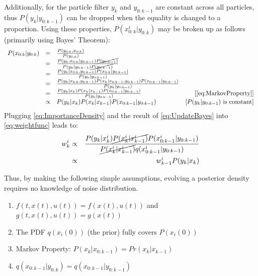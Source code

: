 Additionally, for the particle filter $y_k$ and $y_{0:k-1}$ are 
constant across all particles, thus $P(y_k| y_{0:k-1})$ can
be dropped when the equality is changed to a proportion. 
Using these properties, $P(x^i_{0:k} | y_{0:k})$ may be broken up as follows 
(primarily using Bayes' Theorem):
\begin{equation}
\begin{array}{lclr}
P(x_{0:k} | y_{0:k}) & = & \frac{P(y_{0:k}, x_{0:k})}{P(y_{0:k})} & \\
 & = & \frac{P(y_k, x_{0:k} | y_{0:k-1}) \cancel{P(y_{0:k-1})}}{P(y_k | y_{0:k-1}) \cancel{P(y_{0:k-1})}} & \\
 & = & \frac{P(y_k| x_{0:k}, y_{0:k-1}) P(x_{0:k} | y_{0:k-1})}{P(y_k | y_{0:k-1}) } & \\
 & = & \frac{P(y_k| x_{0:k}, y_{0:k-1}) P(x_k | x_{0:k-1}, y_{0:k-1}) P(x_{0:k-1} | y_{0:k-1})}{P(y_k | y_{0:k-1})} &  \\
& = & \frac{P(y_k| x_k) P(x_k | x_{k-1}) P(x_{0:k-1} | y_{0:k-1})}{P(y_k | y_{0:k-1})}  & [\text{\autoref{eq:MarkovProperty}}]\\
& \propto & P(y_k| x_k) P(x_k | x_{k-1}) P(x_{0:k-1} | y_{0:k-1}) & [P(y_k|y_{0:k-1}) \text{ is constant}]
 \end{array}
 \label{eq:UpdateBayes}
\end{equation}
Plugging \autoref{eq:ImportanceDensity} and the result of \autoref{eq:UpdateBayes}
into \autoref{eq:weightfunc} leads to:
\begin{eqnarray}
w^i_k & \propto & \frac{P(y_k| x^i_k) \cancel{P(x^i_k | x^i_{k-1})} P(x^i_{0:k-1} | y_{0:k-1})}
                         {\cancel{P(x^i_k | x^i_{k-1})}q(x^i_{0:k-1} | y_{0:k-1})} \nonumber \\
& \propto & w^i_{k-1}P(y_k| x_k) 
\label{eq:weightevolve}
\end{eqnarray}

Thus, by making the following simple assumptions, evolving a posterior
density  requires no knowledge of noise distribution.
\begin{enumerate}
\item $f(t, x(t), u(t)) = f(x(t), u(t))$ and $g(t, x(t), u(t)) = g(x(t))$ 
\item The PDF $q(x_i(0))$ (the prior) fully covers $P(x_i(0))$
\item Markov Property: $P(x_k | x_{0:k-1}) = Pr(x_k | x_{k-1})$
\item $q(x_{0:k-1} | y_{0:k}) = q(x_{0:k-1} | y_{0:k-1})$
\end{enumerate}

